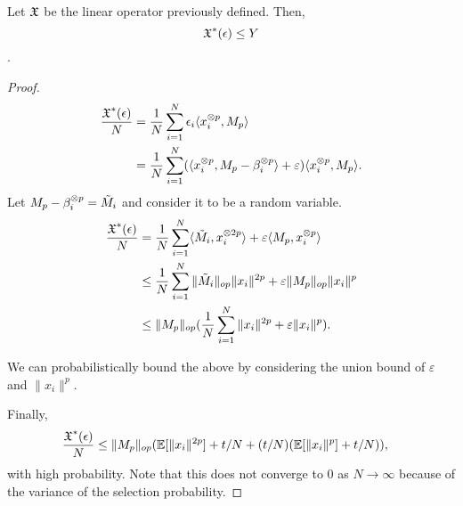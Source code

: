 \begin{lemma}
  Let $\operatorname{\mathfrak{X}}$ be the linear operator previously defined. Then,
  $$\operatorname{\mathfrak{X}}^*(\epsilon) \le Y$$.
\end{lemma}
\begin{proof}
  \begin{align*}
    \frac{\operatorname{\mathfrak{X}}^*(\epsilon)}{N} 
    &= \frac{1}{N}\sum_{i=1}^{N} \epsilon_i \langle x_i^{\otimes p}, M_p \rangle \\
    &= \frac{1}{N}\sum_{i=1}^{N} (\langle x_i^{\otimes p}, M_p - \beta_i^{\otimes p} \rangle + \varepsilon)  \langle x_i^{\otimes p}, M_p \rangle.
  \end{align*}
  Let $M_p - \beta_i^{\otimes p} = \tilde M_i$ and consider it to be a random
  variable.
  \begin{align*}
    \frac{\operatorname{\mathfrak{X}}^*(\epsilon)}{N} 
    &= \frac{1}{N}\sum_{i=1}^{N} \langle \tilde M_i, x_i^{\otimes 2p} \rangle + \varepsilon \langle M_p, x_i^{\otimes p} \rangle \\
    &\le \frac{1}{N}\sum_{i=1}^{N} \|\tilde M_i\|_{op} \|x_i\|^{2p} + \varepsilon \|M_p\|_{op}\|x_i\|^{p} \\
    &\le \|M_p\|_{op} ( \frac{1}{N}\sum_{i=1}^{N} \|x_i\|^{2p} + \varepsilon \|x_i\|^{p} ).
  \end{align*}

  We can probabilistically bound the above by considering the union
  bound of $\varepsilon$ and $\|x_i\|^p$.


  Finally,
  \begin{align*}
    \frac{\operatorname{\mathfrak{X}}^*(\epsilon)}{N} 
    &\le \|M_p\|_{op} (\operatorname{\mathbb{E}}[\|x_i\|^{2p}] + t/N + (t/N) (\operatorname{\mathbb{E}}[ \|x_i\|^{p} ] + t/N) ),
  \end{align*}
  with high probability. Note that this does not converge to $0$ as $N
  \to \infty$ because of the variance of the selection probability.
\end{proof}
